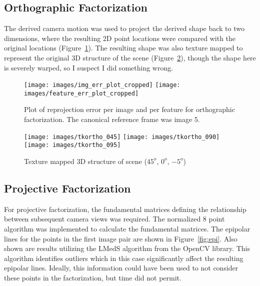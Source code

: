 \documentclass{article}
\begin{document}
\subsection{Orthographic Factorization}
The derived camera motion was used to project the derived shape back to two dimensions, where the resulting 2D point locations were compared with the original locations (Figure~\ref{fig:tk_proj}).
The resulting shape was also texture mapped to represent the original 3D structure of the scene (Figure~\ref{fig:tk_reconst}), though the shape here is severely warped, so I suspect I did something wrong.
\begin{figure}[htb]
	\centerline{
		\mbox{\texttt{[image: images/img\_err\_plot\_cropped]}}
		\mbox{\texttt{[image: images/feature\_err\_plot\_cropped]}}
		}
	\caption{Plot of reprojection error per image and per feature for orthographic factorization.  The canonical reference frame was image 5.}
	\label{fig:tk_proj} \end{figure}
\begin{figure}[htb]
	\centerline{
		\mbox{\texttt{[image: images/tkortho\_045]}}
		\mbox{\texttt{[image: images/tkortho\_090]}}
		\mbox{\texttt{[image: images/tkortho\_095]}}
		}
	\caption{Texture mapped 3D structure of scene ($45^o$, $0^o$, $-5^o$)}
	\label{fig:tk_reconst}
\end{figure}
\subsection{Projective Factorization}
For projective factorization, the fundamental matrices defining the relationship between subsequent
camera views was required.  The normalized 8 point algorithm \cite{hartley1992} was implemented to calculate the fundamental matrices.  The epipolar lines for the points in the first image pair are shown in Figure~\ref{fig:epi}. Also shown are results utilizing the LMedS algorithm from the OpenCV library.  This algorithm identifies outliers which in this case significantly affect the resulting epipolar lines.  Ideally, this information could have been used to not consider these points in the factorization, but time did not permit.
\end{document}
